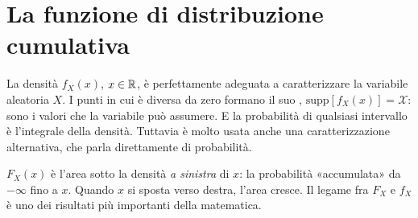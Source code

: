 
\section{La funzione di distribuzione cumulativa}

La densità $f_X(x)$, $x \in \mathbb{R}$, è perfettamente adeguata a caratterizzare la variabile aleatoria $X$. I punti in cui
è diversa da zero formano il suo , $\mathrm{supp}[f_X(x)] = \mathcal{X}$: sono i valori che la
variabile può assumere. E la probabilità di qualsiasi intervallo è l'integrale della densità. Tuttavia è molto usata
anche una caratterizzazione alternativa, che parla direttamente di probabilità.


$F_X(x)$ è l'area sotto la densità \emph{a sinistra} di $x$: la probabilità «accumulata» da $-\infty$ fino a $x$.
Quando $x$ si sposta verso destra, l'area cresce. Il legame fra $F_X$ e $f_X$ è uno dei risultati più importanti
della matematica.

